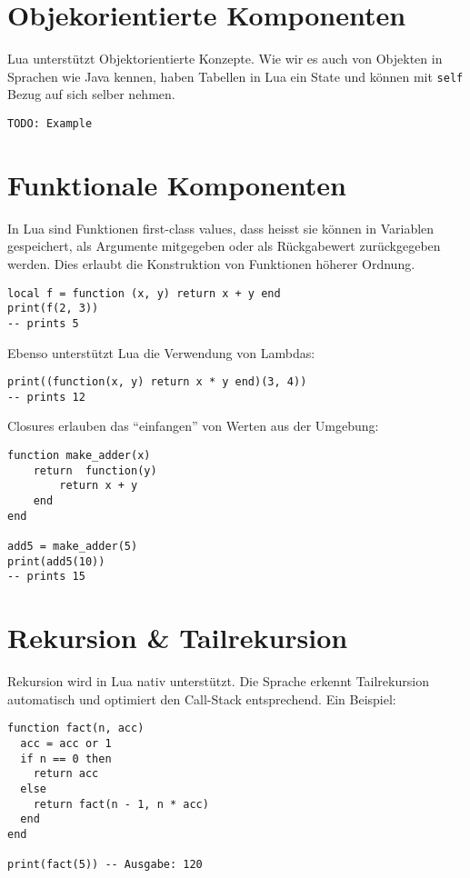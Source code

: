 \documentclass[11pt,a4paper]{article}
\begin{document}
\section*{Objekorientierte Komponenten}

Lua unterstützt Objektorientierte Konzepte. Wie wir es auch von Objekten in Sprachen wie Java kennen, haben Tabellen in Lua ein State und können mit \texttt{self} Bezug auf sich selber nehmen.

\begin{verbatim}
TODO: Example
\end{verbatim}

\section*{Funktionale Komponenten}

In Lua sind Funktionen first-class values, dass heisst sie können in Variablen gespeichert, als Argumente mitgegeben oder als Rückgabewert zurückgegeben werden. Dies erlaubt die Konstruktion von Funktionen höherer Ordnung.

\begin{lstlisting}
local f = function (x, y) return x + y end
print(f(2, 3))
-- prints 5
\end{lstlisting}

Ebenso unterstützt Lua die Verwendung von Lambdas:

\begin{lstlisting}
print((function(x, y) return x * y end)(3, 4))
-- prints 12
\end{lstlisting}

Closures erlauben das “einfangen” von Werten aus der Umgebung:

\begin{lstlisting}
function make_adder(x)
	return  function(y)
		return x + y
	end
end

add5 = make_adder(5)
print(add5(10))
-- prints 15
\end{lstlisting}

\section*{Rekursion \& Tailrekursion}

Rekursion wird in Lua nativ unterstützt. Die Sprache erkennt Tailrekursion automatisch und optimiert den Call-Stack entsprechend. Ein Beispiel:

\begin{lstlisting}
function fact(n, acc)
  acc = acc or 1
  if n == 0 then
    return acc
  else
    return fact(n - 1, n * acc)
  end
end

print(fact(5)) -- Ausgabe: 120
\end{lstlisting}
\end{document}
